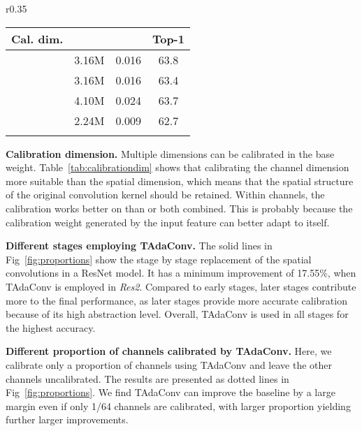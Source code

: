 \documentclass{article} \usepackage{iclr2022_conference,times}
\newcommand{\tablestyle}[2]{\setlength{\tabcolsep}{#1}\renewcommand{\arraystretch}{#2}\centering\small}
\begin{document}
\begin{wraptable}[6]{r}{0.35\textwidth}
\tablestyle{2pt}{1.0}
\vspace{-1.5em}
\caption{Calibration dimension.}
\vspace{-1.2em}
\centering
    \begin{tabular}{lccc}
		\shline
\bf Cal. dim. & \bf   & \bf  &\bf Top-1 \\
\hline
 & 3.16M & 0.016 &63.8 \\
\hline
 & 3.16M & 0.016 & 63.4 \\
 & 4.10M & 0.024 & 63.7 \\
 & 2.24M & 0.009 & 62.7 \\
\shline
	\end{tabular}
	\label{tab:calibrationdim}
	\vspace{-2.5em}
\end{wraptable}
\textbf{Calibration dimension. }
Multiple dimensions can be calibrated in the base weight.
Table~\ref{tab:calibrationdim} shows that calibrating the channel dimension more suitable than the spatial dimension, which means that the spatial structure of the original convolution kernel should be retained. 
Within channels, the calibration works better on  than  or both combined.
This is probably because the calibration weight generated by the input feature can better adapt to itself.

\textbf{Different stages employing TAdaConv. }The solid lines in Fig~\ref{fig:proportions} show the stage by stage replacement of the spatial convolutions in a ResNet model.
It has a minimum improvement of 17.55\%, when TAdaConv is employed in \textit{Res2}.
Compared to early stages, later stages contribute more to the final performance, as later stages provide more accurate calibration because of its high abstraction level.
Overall, TAdaConv is used in all stages for the highest accuracy. 

\textbf{Different proportion of channels calibrated by TAdaConv. }Here, we calibrate only a proportion of channels using TAdaConv and leave the other channels uncalibrated. The results are presented as dotted lines in Fig~\ref{fig:proportions}. 
We find TAdaConv can improve the baseline by a large margin even if only 1/64 channels are calibrated, with larger proportion yielding further larger improvements.
\end{document}

